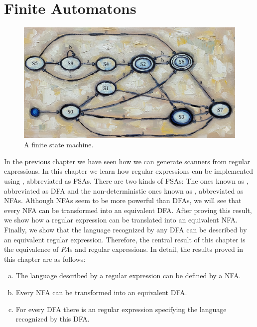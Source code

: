 \chapter{Finite Automatons \label{chapter:finite-state-machines}} 

\begin{figure}[h] 
\centering
  \includegraphics[width=12.5cm]{Abbildungen/finite-state-machine.png}
\caption{A finite state machine.}
\label{fig:finite-state-machine.png}
\end{figure}

\noindent
In the previous chapter we have seen how we can generate scanners from regular expressions.  In this chapter
we learn how regular expressions can be implemented using ,
abbreviated as \textsc{FSA}s. There are two kinds of \textsc{FSA}s: The  ones known as
, abbreviated as \textsc{DFA} 
and the non-deterministic ones known as , abbreviated as
\textsc{NFA}s.  Although \textsc{NFA}s seem to be more powerful than \textsc{DFA}s, we will see that every
\textsc{NFA} can be transformed into an equivalent \textsc{DFA}.  After proving this result, we show how a regular
expression can be translated into an equivalent  \textsc{NFA}.  Finally, we show that the
language recognized by any \textsc{DFA} can be described by an equivalent regular expression.  Therefore, the
central result of this chapter is the equivalence of \textsl{FA}s and regular expressions.
In detail, the results proved in this chapter are as follows:
\begin{enumerate}[(a)]
\item The language described by a regular expression can be defined by a \textsc{NFA}.
\item Every \textsc{NFA} can be transformed into an equivalent \textsc{DFA}.
\item For every \textsc{DFA} there is an regular expression specifying the language recognized by
      this \textsc{DFA}.
\end{enumerate}


